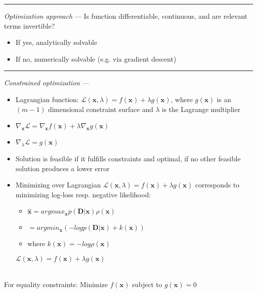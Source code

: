 {\color{lightgray}\hrule height 0.001mm}

\emph{Optimization approach} --- 
Is function differentiable, continuous, and are relevant terms invertible?
\begin{itemize}
    \item If yes, analytically solvable
    \item If no, numerically solvable (e.g. via gradient descent)
\end{itemize}

{\color{lightgray}\hrule height 0.001mm}

\emph{Constrained optimization} --- 
\begin{itemize}
    \item Lagrangian function: $\mathcal{L}(\boldsymbol{x},\lambda) = f(\boldsymbol{x}) + \lambda g(\boldsymbol{x})$, where $g(\boldsymbol{x})$ is an $(m-1)$ dimensional constraint surface and $\lambda$ is the Lagrange multiplier
    \item$\nabla_{\boldsymbol{x}} \mathcal{L} = \nabla_{\boldsymbol{x}} f(\boldsymbol{x}) + \lambda \nabla_{\boldsymbol{x}} g(\boldsymbol{x})$
    \item$\nabla_{\lambda} \mathcal{L} = g(\boldsymbol{x})$
    \item Solution is feasible if it fulfills constraints and optimal, if no other feasible solution produces a lower error
    \item Minimizing over Lagrangian $\mathcal{L}(\boldsymbol{x},\lambda) = f(\boldsymbol{x}) + \lambda g(\boldsymbol{x})$ corresponds to minimizing log-loss resp. negative likelihood:
    \begin{itemize}
        \item $\hat{\boldsymbol{x}} = argmax_\boldsymbol{x} p(\boldsymbol{D} |\boldsymbol{x}) \rho(\boldsymbol{x}) $ 
        \item $= argmin_\boldsymbol{x} (- log p(\boldsymbol{D} |\boldsymbol{x}) + k(\boldsymbol{x}))$
        \item where $k(\boldsymbol{x}) = -log \rho(\boldsymbol{x})$
    \end{itemize}
    $\mathcal{L}(\boldsymbol{x},\lambda) = f(\boldsymbol{x}) + \lambda g(\boldsymbol{x})$
\end{itemize}\\
For equality constraints: Minimize $f(\boldsymbol{x})$ subject to $g(\boldsymbol{x}) = 0$
